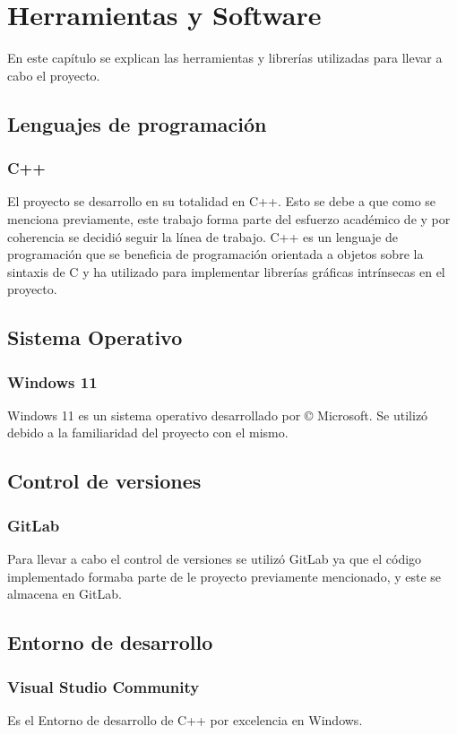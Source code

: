 \chapter{Herramientas y Software}
\label{chap:hs}
En este capítulo se explican las herramientas y librerías utilizadas para llevar a cabo el proyecto.
\section{Lenguajes de programación}
    \subsection{C++}    
El proyecto se desarrollo en su totalidad en C++. Esto se debe a que como se menciona previamente, este trabajo forma parte del esfuerzo académico de \citeauthor{IglesiasGuitian2022} y por coherencia se decidió seguir la línea de trabajo.
C++ es un lenguaje de programación que se beneficia de programación orientada a objetos sobre la sintaxis de C y ha utilizado para implementar librerías gráficas intrínsecas en el proyecto.

\section{Sistema Operativo}
\subsection{Windows 11}
Windows 11 es un sistema operativo desarrollado por  © Microsoft. Se utilizó debido a la familiaridad del proyecto con el mismo.
\section{Control de versiones}
    \subsection{GitLab}
Para llevar a cabo el control de versiones se utilizó GitLab ya que el código implementado formaba parte de le proyecto previamente mencionado, y este se almacena en GitLab.
\section{Entorno de desarrollo}
    \subsection{Visual Studio Community}
Es el Entorno de desarrollo de C++ por excelencia en Windows.
